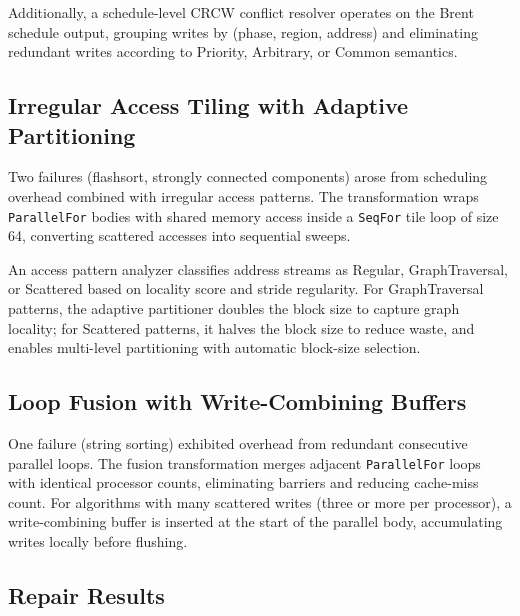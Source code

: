 \documentclass[11pt]{article}
\begin{document}
Additionally, a schedule-level CRCW conflict resolver operates on the
Brent schedule output, grouping writes by (phase, region, address) and
eliminating redundant writes according to Priority, Arbitrary, or Common
semantics.

\subsection{Irregular Access Tiling with Adaptive Partitioning}

Two failures (flashsort, strongly connected components) arose from
scheduling overhead combined with irregular access patterns.  The
transformation wraps \texttt{ParallelFor} bodies with shared memory
access inside a \texttt{SeqFor} tile loop of size 64, converting
scattered accesses into sequential sweeps.

An access pattern analyzer classifies address streams as Regular,
GraphTraversal, or Scattered based on locality score and stride
regularity.  For GraphTraversal patterns, the adaptive partitioner
doubles the block size to capture graph locality; for Scattered patterns,
it halves the block size to reduce waste, and enables multi-level
partitioning with automatic block-size selection.

\subsection{Loop Fusion with Write-Combining Buffers}

One failure (string sorting) exhibited overhead from redundant
consecutive parallel loops.  The fusion transformation merges adjacent
\texttt{ParallelFor} loops with identical processor counts, eliminating
barriers and reducing cache-miss count.  For algorithms with
many scattered writes (three or more per processor), a write-combining
buffer is inserted at the start of the parallel body, accumulating
writes locally before flushing.

\subsection{Repair Results}
\end{document}
